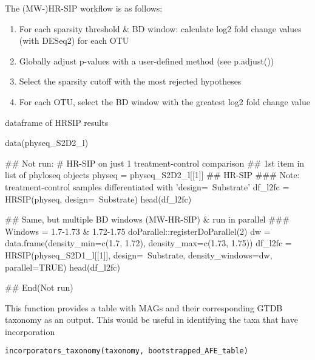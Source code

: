 \documentclass[a4paper]{book}
\begin{document}
%
\begin{Details}\relax
The (MW-)HR-SIP workflow is as follows:

\begin{enumerate}

\item{} For each sparsity threshold \& BD window: calculate log2 fold change values (with DESeq2) for each OTU
\item{} Globally adjust p-values with a user-defined method (see p.adjust())
\item{} Select the sparsity cutoff with the most rejected hypotheses
\item{} For each OTU, select the BD window with the greatest log2 fold change value

\end{enumerate}

\end{Details}
%
\begin{Value}
dataframe of HRSIP results
\end{Value}
%
\begin{Examples}
\begin{ExampleCode}
data(physeq_S2D2_l)

## Not run: 
# HR-SIP on just 1 treatment-control comparison
## 1st item in list of phyloseq objects
physeq = physeq_S2D2_l[[1]]
## HR-SIP
### Note: treatment-control samples differentiated with 'design=~Substrate'
df_l2fc = HRSIP(physeq, design=~Substrate)
head(df_l2fc)

## Same, but multiple BD windows (MW-HR-SIP) & run in parallel
### Windows = 1.7-1.73 & 1.72-1.75
doParallel::registerDoParallel(2)
dw = data.frame(density_min=c(1.7, 1.72), density_max=c(1.73, 1.75))
df_l2fc = HRSIP(physeq_S2D1_l[[1]],
                design=~Substrate,
                density_windows=dw,
                parallel=TRUE)
head(df_l2fc)

## End(Not run)

\end{ExampleCode}
\end{Examples}
%
\begin{Description}\relax
This function provides a table with MAGs and their corresponding GTDB taxonomy
as an output. This would be useful in identifying the taxa that have incorporation
\end{Description}
%
\begin{Usage}
\begin{verbatim}
incorporators_taxonomy(taxonomy, bootstrapped_AFE_table)
\end{verbatim}
\end{Usage}
\end{document}

